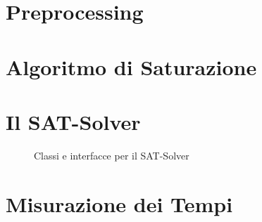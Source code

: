 \documentclass[./main.tex]{subfiles}
\begin{document}
\section{Preprocessing} \label{sec:vampire_preprocessing}
\section{Algoritmo di Saturazione} \label{sec:vampire_saturazione}
\section{Il SAT-Solver} \label{sec:vampire_sat}

\begin{figure}[h]
    \centering
    \scalebox{0.5}{
        
    }
    \caption{Classi e interfacce per il SAT-Solver}
    \label{fig:vampire_sat_solver}
\end{figure}
\section{Misurazione dei Tempi} \label{sec:vampire_time}
  
\end{document}
